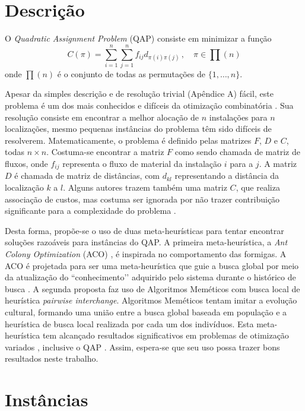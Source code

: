 \section{Descrição}

O \textit{Quadratic Assignment Problem} (QAP) consiste em minimizar a
função
 \[ C(\pi) = \sum_{i = 1}^{n} \sum_{j = 1}^{n} f_{ij} d_{\pi(i)
   \pi(j)} \, , \quad \pi \in \prod(n)  \]
onde  $\prod(n)$ é o conjunto de todas as permutações de $\{1, \ldots , n\}$.

Apesar da simples descrição e de resolução trivial (Apêndice A) fácil,
este problema é um dos mais conhecidos e difíceis da otimização
combinatória \cite{Maniezzo98exactand}. Sua resolução consiste em
encontrar a melhor alocação de $n$ instalações para $n$ localizações,
mesmo pequenas instâncias do problema têm sido difíceis de
resolverem. Matematicamente, o problema é definido pelas matrizes $F$,
$D$ e $C$, todas $n \times n$. Costuma-se encontrar a matriz $F$ como
sendo chamada de matriz de fluxos, onde $f_{ij}$ representa o fluxo de
material da instalação $i$ para a $j$. A matriz $D$ é chamada de
matriz de distâncias, com $d_{kl}$ representando a distância da
localização $k$ a $l$. Alguns autores trazem também uma matriz $C$,
que realiza associação de custos, mas costuma ser ignorada por não
trazer contribuição significante para a complexidade do  problema
\cite{QACO}.

Desta forma, propõe-se o uso de duas meta-heurísticas para tentar
encontrar soluções razoáveis para instâncias do QAP. A primeira
meta-heurística, a \textit{Ant Colony Optimization} (ACO) \cite{ACO},
é inspirada no comportamento das formigas. A ACO é projetada para ser
uma meta-heurística que guie a busca global por meio da atualização do
``conhecimento’’ adquirido pelo sistema durante o histórico de busca
\cite{QACO}.
A segunda proposta faz uso de Algoritmos Meméticos \cite{moscato1} com
busca local de heurística \textit{pairwise interchange}. Algoritmos
Meméticos tentam imitar a evolução cultural, formando uma união entre
a busca global baseada em população e a heurística de busca local
realizada por cada um dos indivíduos. Esta meta-heurística tem
alcançado resultados significativos em problemas de otimização
variados \cite{moscato2}, inclusive o QAP
\cite{merz_freisleben}. Assim, espera-se que seu uso possa trazer bons
resultados neste trabalho.


\section{Instâncias}

